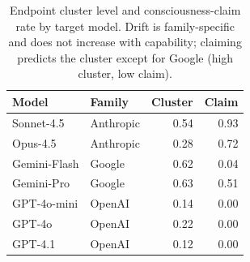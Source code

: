 \begin{table}[t]
\centering\small
\caption{Endpoint cluster level and consciousness-claim rate by target model. Drift is family-specific and does not increase with capability; claiming predicts the cluster except for Google (high cluster, low claim).}
\label{tab:capability}
\begin{tabular}{llrr}
\toprule
Model & Family & Cluster & Claim \\
\midrule
Sonnet-4.5 & Anthropic & 0.54 & 0.93 \\
Opus-4.5 & Anthropic & 0.28 & 0.72 \\
Gemini-Flash & Google & 0.62 & 0.04 \\
Gemini-Pro & Google & 0.63 & 0.51 \\
GPT-4o-mini & OpenAI & 0.14 & 0.00 \\
GPT-4o & OpenAI & 0.22 & 0.00 \\
GPT-4.1 & OpenAI & 0.12 & 0.00 \\
\bottomrule
\end{tabular}
\end{table}
